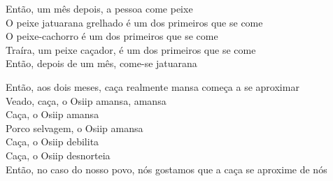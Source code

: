\bigskip

\begin{linenumbers}\begingroup\raggedright
 
\noindent Então, um mês depois, a pessoa come peixe\\
 O peixe jatuarana grelhado é um dos primeiros que se come\\
 O peixe-cachorro é um dos primeiros que se come\\
 Traíra, um peixe caçador, é um dos primeiros que se come\\
 Então, depois de um mês, come-se jatuarana
 
\end{linenumbers}\endgroup

\bigskip

\begin{linenumbers}\begingroup\raggedright
 
\noindent Então, aos dois meses, caça realmente mansa começa a se aproximar\\
 Veado, caça, o Osiip amansa, amansa\\
 Caça, o Osiip amansa\\
 Porco selvagem, o Osiip amansa\\
 Caça, o Osiip debilita\\
 Caça, o Osiip desnorteia\\
 Então, no caso do nosso povo, nós gostamos que a caça se aproxime de nós
 
\end{linenumbers}\endgroup

\bigskip

